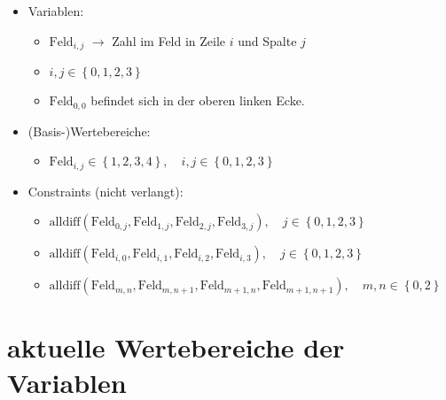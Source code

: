 \documentclass[a4paper,draft=false,oneside,12pt,ngerman]{scrreprt}
\begin{document}
\begin{itemize}
    \item Variablen:
        \begin{itemize}
            \item $ \text{Feld}_{i,j} $ $\rightarrow$ Zahl im Feld in Zeile $ i
                $ und Spalte $ j $
            \item $ i, j \in \left\{ 0, 1, 2, 3 \right\} $
            \item $ \text{Feld}_{0,0} $ befindet sich in der oberen linken Ecke.
        \end{itemize}
    \item (Basis-)Wertebereiche:
        \begin{itemize}
            \item $ \text{Feld}_{i,j} \in \left\{ 1, 2, 3, 4 \right\}, \quad i, j \in \left\{ 0, 1, 2, 3 \right\} $
        \end{itemize}
    \item Constraints (nicht verlangt):
        \begin{itemize}
            \item $ \text{alldiff}(\text{Feld}_{0,j}, \text{Feld}_{1,j}, \text{Feld}_{2,j}, \text{Feld}_{3,j}), \quad j \in \left\{ 0, 1, 2, 3 \right\} $
            \item $ \text{alldiff}(\text{Feld}_{i,0}, \text{Feld}_{i,1}, \text{Feld}_{i,2}, \text{Feld}_{i,3}), \quad j \in \left\{ 0, 1, 2, 3 \right\} $
            \item $ \text{alldiff}(\text{Feld}_{m,n}, \text{Feld}_{m,n+1}, \text{Feld}_{m+1,n}, \text{Feld}_{m+1,n+1}), \quad m, n \in \left\{ 0, 2\right\} $
        \end{itemize}
\end{itemize}

\section{aktuelle Wertebereiche der Variablen}
\label{sec:aktuelle_wertebereiche_der_variablen}
\end{document}
